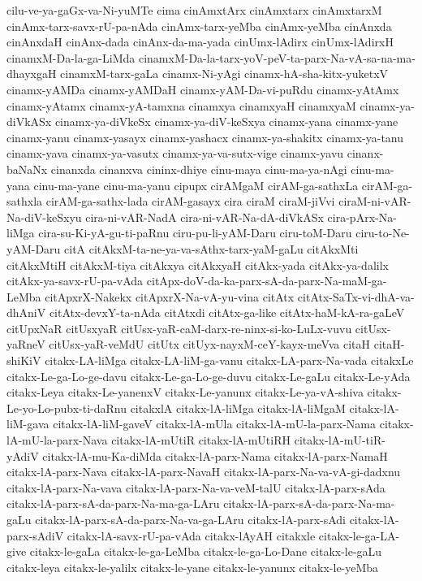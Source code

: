 {cilu-ve-ya-gaGx-va-Ni-yuMTe
cima
cinAmxtArx
cinAmxtarx
cinAmxtarxM
cinAmx-tarx-savx-rU-pa-nAda
cinAmx-tarx-yeMba
cinAmx-yeMba
cinAnxda
cinAnxdaH
cinAnx-dada
cinAnx-da-ma-yada
cinUmx-lAdirx
cinUmx-lAdirxH
cinamxM-Da-la-ga-LiMda
cinamxM-Da-la-tarx-yoV-peV-ta-parx-Na-vA-sa-na-ma-dhayxgaH
cinamxM-tarx-gaLa
cinamx-Ni-yAgi
cinamx-hA-sha-kitx-yuketxV
cinamx-yAMDa
cinamx-yAMDaH
cinamx-yAM-Da-vi-puRdu
cinamx-yAtAmx
cinamx-yAtamx
cinamx-yA-tamxna
cinamxya
cinamxyaH
cinamxyaM
cinamx-ya-diVkASx
cinamx-ya-diVkeSx
cinamx-ya-diV-keSxya
cinamx-yana
cinamx-yane
cinamx-yanu
cinamx-yasayx
cinamx-yashacx
cinamx-ya-shakitx
cinamx-ya-tanu
cinamx-yava
cinamx-ya-vasutx
cinamx-ya-va-sutx-vige
cinamx-yavu
cinanx-baNaNx
cinanxda
cinanxva
cininx-dhiye
cinu-maya
cinu-ma-ya-nAgi
cinu-ma-yana
cinu-ma-yane
cinu-ma-yanu
cipupx
cirAMgaM
cirAM-ga-sathxLa
cirAM-ga-sathxla
cirAM-ga-sathx-lada
cirAM-gasayx
cira
ciraM
ciraM-jiVvi
ciraM-ni-vAR-Na-diV-keSxyu
cira-ni-vAR-NadA
cira-ni-vAR-Na-dA-diVkASx
cira-pArx-Na-liMga
cira-su-Ki-yA-gu-ti-paRnu
ciru-pu-li-yAM-Daru
ciru-toM-Daru
ciru-to-Ne-yAM-Daru
citA
citAkxM-ta-ne-ya-va-sAthx-tarx-yaM-gaLu
citAkxMti
citAkxMtiH
citAkxM-tiya
citAkxya
citAkxyaH
citAkx-yada
citAkx-ya-dalilx
citAkx-ya-savx-rU-pa-vAda
citApx-doV-da-ka-parx-sA-da-parx-Na-maM-ga-LeMba
citApxrX-Nakekx
citApxrX-Na-vA-yu-vina
citAtx
citAtx-SaTx-vi-dhA-va-dhAniV
citAtx-devxY-ta-nAda
citAtxdi
citAtx-ga-like
citAtx-haM-kA-ra-gaLeV
citUpxNaR
citUsxyaR
citUsx-yaR-caM-darx-re-ninx-si-ko-LuLx-vuvu
citUsx-yaRneV
citUsx-yaR-veMdU
citUtx
citUyx-nayxM-ceY-kayx-meVva
citaH
citaH-shiKiV
citakx-LA-liMga
citakx-LA-liM-ga-vanu
citakx-LA-parx-Na-vada
citakxLe
citakx-Le-ga-Lo-ge-davu
citakx-Le-ga-Lo-ge-duvu
citakx-Le-gaLu
citakx-Le-yAda
citakx-Leya
citakx-Le-yanenxV
citakx-Le-yanunx
citakx-Le-ya-vA-shiva
citakx-Le-yo-Lo-pubx-ti-daRnu
citakxlA
citakx-lA-liMga
citakx-lA-liMgaM
citakx-lA-liM-gava
citakx-lA-liM-gaveV
citakx-lA-mUla
citakx-lA-mU-la-parx-Nama
citakx-lA-mU-la-parx-Nava
citakx-lA-mUtiR
citakx-lA-mUtiRH
citakx-lA-mU-tiR-yAdiV
citakx-lA-mu-Ka-diMda
citakx-lA-parx-Nama
citakx-lA-parx-NamaH
citakx-lA-parx-Nava
citakx-lA-parx-NavaH
citakx-lA-parx-Na-va-vA-gi-dadxnu
citakx-lA-parx-Na-vava
citakx-lA-parx-Na-va-veM-talU
citakx-lA-parx-sAda
citakx-lA-parx-sA-da-parx-Na-ma-ga-LAru
citakx-lA-parx-sA-da-parx-Na-ma-gaLu
citakx-lA-parx-sA-da-parx-Na-va-ga-LAru
citakx-lA-parx-sAdi
citakx-lA-parx-sAdiV
citakx-lA-savx-rU-pa-vAda
citakx-lAyAH
citakxle
citakx-le-ga-LA-give
citakx-le-gaLa
citakx-le-ga-LeMba
citakx-le-ga-Lo-Dane
citakx-le-gaLu
citakx-leya
citakx-le-yalilx
citakx-le-yane
citakx-le-yanunx
citakx-le-yeMba
}
